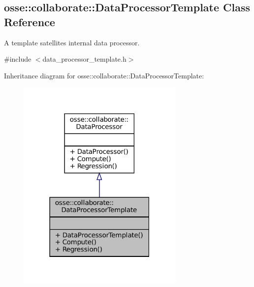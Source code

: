 \hypertarget{classosse_1_1collaborate_1_1_data_processor_template}{}\subsection{osse\+:\+:collaborate\+:\+:Data\+Processor\+Template Class Reference}
\label{classosse_1_1collaborate_1_1_data_processor_template}


A template satellite\textquotesingle{}s internal data processor.  




{\ttfamily \#include $<$data\+\_\+processor\+\_\+template.\+h$>$}



Inheritance diagram for osse\+:\+:collaborate\+:\+:Data\+Processor\+Template\+:
\nopagebreak
\begin{figure}[H]
\begin{center}
\leavevmode
\includegraphics[width=231pt]{classosse_1_1collaborate_1_1_data_processor_template__inherit__graph}
\end{center}
\end{figure}
